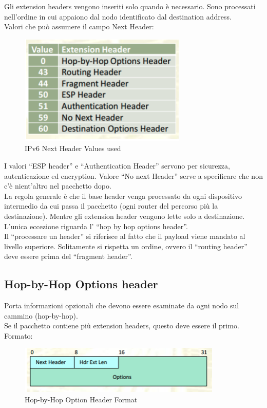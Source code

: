 \documentclass{article}
\begin{document}
Gli extension headers vengono inseriti solo quando è necessario. Sono processati nell’ordine in cui appaiono dal nodo identificato dal destination address. \\
Valori che può assumere il campo Next Header:

\begin{figure}[H]
\centering
\includegraphics[scale=0.5]{figures/next header used.png}
\caption{IPv6 Next Header Values used}
\end{figure}

I valori “ESP header” e “Authentication Header” servono per sicurezza, autenticazione ed encryption. Valore “No next Header” serve a specificare che non c’è nient’altro nel pacchetto dopo. \\
La regola generale è che il base header venga processato da ogni dispositivo intermedio da cui passa il pacchetto (ogni router del percorso più la destinazione). Mentre gli extension header vengono lette solo a destinazione. L’unica eccezione riguarda l’ “hop by hop options header”.\\
Il “processare un header” si riferisce al fatto che il payload viene mandato al livello superiore.
Solitamente si rispetta un ordine, ovvero il “routing header” deve essere prima del “fragment header”.

\subsection{Hop-by-Hop Options header}
Porta informazioni opzionali che devono essere esaminate da ogni nodo sul cammino (hop-by-hop).\\
Se il pacchetto contiene più extension headers, questo deve essere il primo.\\ 
Formato:

\begin{figure}[H]
\centering
\includegraphics[scale=0.5]{figures/hopbyhop format.png}
\caption{Hop-by-Hop Option Header Format}
\end{figure}
\end{document}
